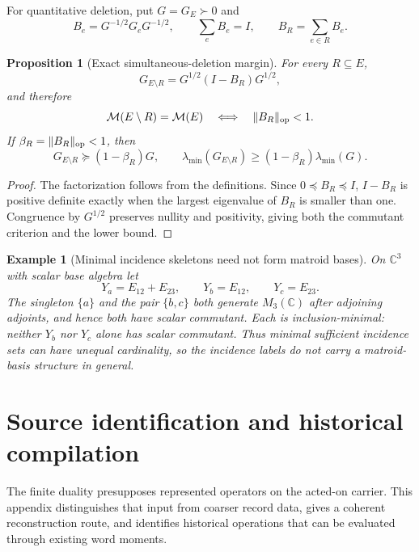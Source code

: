 \documentclass[11pt]{article}
\numberwithin{equation}{section}
\newtheorem{proposition}[theorem]{Proposition}
\newtheorem{example}[theorem]{Example}
\theoremstyle{definition}
\theoremstyle{remark}
\newcommand{\C}{\mathbb C}
\newcommand{\M}{\mathcal M}
\begin{document}
For quantitative deletion, put $G=G_E\succ0$ and
\[
 B_e=G^{-1/2}G_eG^{-1/2},\qquad \sum_eB_e=I,
 \qquad B_R=\sum_{e\in R}B_e.
\]

\begin{proposition}[Exact simultaneous-deletion margin]
\label{prop:deletion-margin}
For every $R\subseteq E$,
\begin{equation}
 G_{E\setminus R}=G^{1/2}(I-B_R)G^{1/2},
 \label{eq:deletion-factor}
\end{equation}
and therefore
\begin{equation}
 \M(E\setminus R)=\M(E)
 \quad\Longleftrightarrow\quad \|B_R\|_{\rm op}<1.
 \label{eq:deletion-margin}
\end{equation}
If $\beta_R=\|B_R\|_{\rm op}<1$, then
\[
 G_{E\setminus R}\succeq(1-\beta_R)G,
 \qquad
 \lambda_{\min}(G_{E\setminus R})
 \ge(1-\beta_R)\lambda_{\min}(G).
\]
\end{proposition}

\begin{proof}
The factorization follows from the definitions.  Since
$0\preceq B_R\preceq I$, $I-B_R$ is positive definite exactly when the
largest eigenvalue of $B_R$ is smaller than one.  Congruence by $G^{1/2}$ preserves
nullity and positivity, giving both the commutant criterion and the lower
bound.
\end{proof}

\begin{example}[Minimal incidence skeletons need not form matroid bases]
\label{ex:nonmatroid-skeleton}
On $\C^3$ with scalar base algebra let
\[
 Y_a=E_{12}+E_{23},\qquad Y_b=E_{12},\qquad Y_c=E_{23}.
\]
The singleton $\{a\}$ and the pair $\{b,c\}$ both generate $M_3(\C)$ after
adjoining adjoints, and hence both have scalar commutant.  Each is
inclusion-minimal: neither $Y_b$ nor $Y_c$ alone has scalar commutant.  Thus
minimal sufficient incidence sets can have unequal cardinality, so the
incidence labels do not carry a matroid-basis structure in general.
\end{example}


\section{Source identification and historical compilation}
\label{app:source-identifiability}

The finite duality presupposes represented operators on the acted-on
carrier.  This appendix distinguishes that input from coarser record data,
gives a coherent reconstruction route, and identifies historical operations
that can be evaluated through existing word moments.
\end{document}
